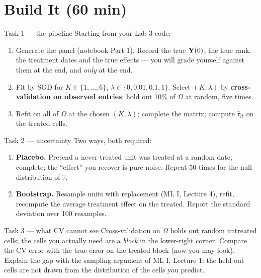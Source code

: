 \documentclass[11pt]{article}
\begin{document}
\section{Build It (60 min)}
\begin{task}{Task 1 --- the pipeline}
Starting from your Lab 3 code:
\begin{enumerate}[nosep]
  \item Generate the panel (notebook Part 1). Record the true $\mathbf{Y}(0)$, the true rank, the treatment dates and the true effects --- you will grade yourself against them at the end, and \emph{only} at the end.
  \item Fit by SGD for $K\in\{1,\dots,6\}$, $\lambda\in\{0,0.01,0.1,1\}$. Select $(K,\lambda)$ by \textbf{cross-validation on observed entries}: hold out 10\% of $\Omega$ at random, five times.
  \item Refit on all of $\Omega$ at the chosen $(K,\lambda)$; complete the matrix; compute $\hat\tau_{it}$ on the treated cells.
\end{enumerate}
\end{task}
\begin{task}{Task 2 --- uncertainty}
Two ways, both required:
\begin{enumerate}[nosep]
  \item \textbf{Placebo.} Pretend a never-treated unit was treated at a random date; complete; the ``effect'' you
        recover is pure noise. Repeat 50 times for the null distribution of $\hat\tau$.
  \item \textbf{Bootstrap.} Resample units with replacement (ML I, Lecture 4), refit, recompute the average
        treatment effect on the treated. Report the standard deviation over 100 resamples.
\end{enumerate}
\end{task}
\begin{task}{Task 3 --- what CV cannot see}
Cross-validation on $\Omega$ holds out random untreated cells; the cells you actually need are a
\emph{block} in the lower-right corner. Compare the CV error with the true error on the treated block
(now you may look). Explain the gap with the sampling argument of ML I, Lecture 1: the held-out cells are
not drawn from the distribution of the cells you predict.
\end{task}
\end{document}
